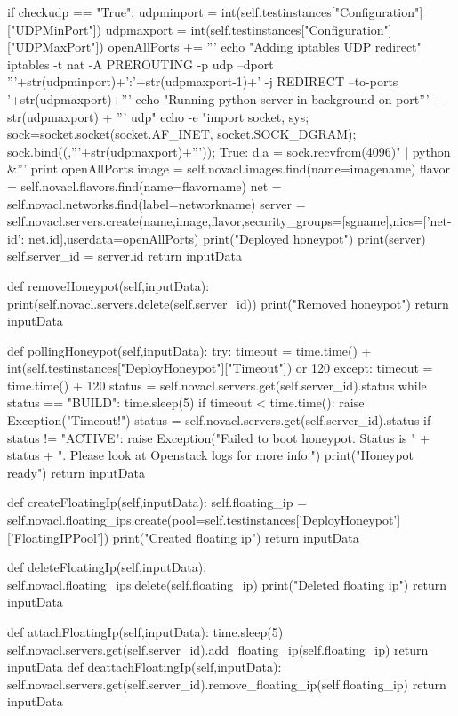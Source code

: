 \begin{python}
		if checkudp == "True":
			udpminport = int(self.testinstances["Configuration"]["UDPMinPort"])
			udpmaxport = int(self.testinstances["Configuration"]["UDPMaxPort"])
			openAllPorts += '''
			echo "Adding iptables UDP redirect"\n
			iptables -t nat -A PREROUTING -p udp --dport '''+str(udpminport)+':'+str(udpmaxport-1)+' -j REDIRECT --to-ports '+str(udpmaxport)+'''\n
			echo "Running python server in background on port''' + str(udpmaxport) + ''' udp\n"
			echo -e "import socket, sys; sock=socket.socket(socket.AF_INET, socket.SOCK_DGRAM); sock.bind((,'''+str(udpmaxport)+''')); \nwhile True: d,a = sock.recvfrom(4096)\n" | python &'''
		print openAllPorts
		image = self.novacl.images.find(name=imagename)
		flavor = self.novacl.flavors.find(name=flavorname)
		net = self.novacl.networks.find(label=networkname)
		server = self.novacl.servers.create(name,image,flavor,security_groups=[sgname],nics=[{'net-id': net.id}],userdata=openAllPorts)
		print("Deployed honeypot")
		print(server)
		self.server_id = server.id
		return inputData

	def removeHoneypot(self,inputData):
		print(self.novacl.servers.delete(self.server_id))
		print("Removed honeypot")
		return inputData

	def pollingHoneypot(self,inputData):
		try:
			timeout = time.time() + int(self.testinstances["DeployHoneypot"]["Timeout"]) or 120
		except:
			timeout = time.time() + 120
		status = self.novacl.servers.get(self.server_id).status
		while status == "BUILD":
			time.sleep(5)
			if timeout < time.time():
				raise Exception("Timeout!")
			status = self.novacl.servers.get(self.server_id).status
		if status != "ACTIVE":
			raise Exception("Failed to boot honeypot. Status is " + status + ". Please look at Openstack logs for more info.")
		print("Honeypot ready")
		return inputData


	def createFloatingIp(self,inputData):
		self.floating_ip = self.novacl.floating_ips.create(pool=self.testinstances['DeployHoneypot']['FloatingIPPool'])
		print("Created floating ip")
		return inputData

	def deleteFloatingIp(self,inputData):
		self.novacl.floating_ips.delete(self.floating_ip)
		print("Deleted floating ip")
		return inputData


	def attachFloatingIp(self,inputData):
		time.sleep(5)
		self.novacl.servers.get(self.server_id).add_floating_ip(self.floating_ip)
		return inputData
	def deattachFloatingIp(self,inputData):
		self.novacl.servers.get(self.server_id).remove_floating_ip(self.floating_ip)
		return inputData


\end{python}
